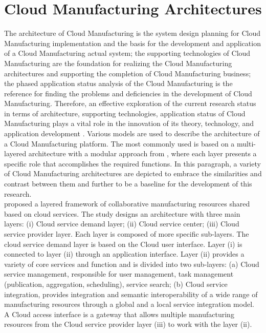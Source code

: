 \section{Cloud Manufacturing Architectures}
The architecture of Cloud Manufacturing is the system design planning for Cloud Manufacturing implementation and the basis for the development and application of a Cloud Manufacturing actual system; the supporting technologies of Cloud Manufacturing are the foundation for realizing the Cloud Manufacturing architectures and supporting the completion of Cloud Manufacturing business; the phased application status analysis of the Cloud Manufacturing is the reference for finding the problems and deficiencies in the development of Cloud Manufacturing. Therefore, an effective exploration of the current research status in terms of architecture, supporting technologies, application status of Cloud Manufacturing plays a vital role in the innovation of its theory, technology, and application development \parencite{lim_theory_2020}. Various models are used to describe the architecture of a Cloud Manufacturing platform. The most commonly used is based on a multi- layered architecture with a modular approach from \parencite{he_state---art_2015}, where each layer presents a specific role that accomplishes the required functions. In this paragraph, a variety of Cloud Manufacturing architectures are depicted to embrace the similarities and contrast between them and further to be a baseline for the development of this research.\\
\textcite{ding_cloud-based_2012} proposed a layered framework of collaborative manufacturing resources shared based on cloud services. The study designs an architecture with three main layers: (i) Cloud service demand layer; (ii) Cloud service center; (iii) Cloud service provider layer. Each layer is composed of more specific sub-layers. The cloud service demand layer is based on the Cloud user interface. Layer (i) is connected to layer (ii) through an application interface. Layer (ii) provides a variety of core services and function and is divided into two sub-layers: (a) Cloud service management, responsible for user management, task management (publication, aggregation, scheduling), service search; (b) Cloud service integration, provides integration and semantic interoperability of a wide range of manufacturing resources through a global and a local service integration model. A Cloud access interface is a gateway that allows multiple manufacturing resources from the Cloud service provider layer (iii) to work with the layer (ii).

